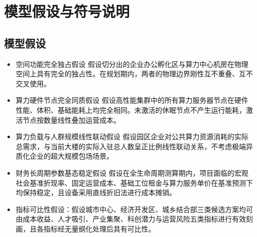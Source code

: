 \documentclass[12pt,a4paper]{article}
\begin{document}
\section{模型假设与符号说明}
\subsection{模型假设}

\begin{itemize}
    \item 空间功能完全独占假设
假设切分出的企业办公孵化区与算力中心机房在物理空间上具有完全的独占性。在规划期内，两者的物理边界刚性互不重叠、互不交叉使用。\\
    \item 算力硬件节点完全同质假设
假设高性能集群中的所有算力服务器节点在硬件性能、体积、基础能耗上均完全相同。未激活的休眠节点不产生运行能耗，激活节点按数量线性叠加运营成本。\\
    \item 算力负载与人群规模线性联动假设
假设园区企业对公共算力资源消耗的实际总需求，与当前大楼的实际入驻总人数呈正比例线性联动关系，不考虑极端异质化企业的超大规模包场场景。\\
    \item 财务长周期参数基态稳定假设
假设在全生命周期测算期内，项目面临的宏观社会基准折现率、固定运营成本、基础工位租金与算力服务单价在基准预测下均保持稳定，且设备采用直线折旧法进行成本摊销。\\
    \item 指标可比性假设：假设城市中心、经济开发区、城乡结合部三类候选方案均可由成本收益、人才吸引、产业集聚、科创潜力与运营风险五类指标进行有效刻画，且各指标经无量纲化处理后具有可比性。\\
\end{itemize}
\end{document}
